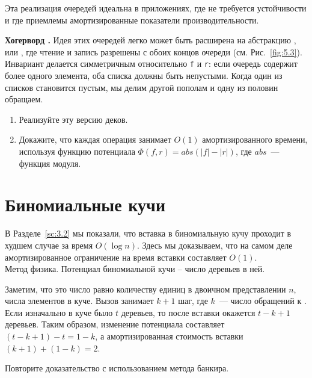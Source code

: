 \begin{frame}[fragile]{}
\begin{hint}
  Эта реализация очередей идеальна в приложениях, где не требуется
  устойчивости и где приемлемы амортизированные показатели
  производительности.
\end{hint}

\end{frame}

\ifanswers
\begin{frame}[fragile]{}
\begin{exercise}\label{ex:5.1}
  \textbf{Хогерворд \cite{Hoogerwoord1992}.}  Идея этих очередей легко
  может быть расширена на абстракцию , или , где чтение и запись разрешены с
  обоих концов очереди (см. Рис.~\ref{fig:5.3}). Инвариант делается
  симметричным относительно \lstinline!f! и \lstinline!r!: если
  очередь содержит более одного элемента, оба списка должны быть
  непустыми. Когда один из списков становится пустым, мы делим другой
  пополам и одну из половин обращаем.
  
  \begin{enumerate}
    \item Реализуйте эту версию деков.
    \item Докажите, что каждая операция занимает $O(1)$ амортизированного
    времени, используя функцию потенциала $\Phi(f,r) = abs(|f| -
    |r|)$, где $abs$~--- функция модуля.
  \end{enumerate}
\end{exercise}
\end{frame}
\fi

\section{Биномиальные кучи}
\label{sc:5.3}


\begin{frame}[fragile]{}
В Разделе~\ref{sc:3.2} мы показали, что вставка в биномиальную кучу
проходит в худшем случае за время $O(\log n)$. Здесь мы доказываем,
что на самом деле амортизированное ограничение на время вставки
составляет $O(1)$.\\

Метод физика. Потенциал биномиальной кучи -- число деревьев в ней. 

Заметим, что это число равно количеству
единиц в двоичном представлении $n$, числа элементов в куче.  Вызов
 занимает $k+1$ шаг, где $k$~--- число обращений к
. Если изначально в куче было $t$ деревьев, то после
вставки окажется $t - k + 1$ деревьев. Таким образом, изменение
потенциала составляет $(t - k + 1) - t = 1 - k$, а амортизированная
стоимость вставки $(k + 1) + (1 - k) = 2$.\\

\begin{exercise}\label{ex:5.2}
  Повторите доказательство с использованием метода банкира.
\end{exercise}

\end{frame}


